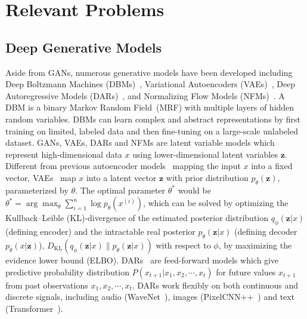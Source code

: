 \section{Relevant Problems}
\label{sec:related}

\subsection{Deep Generative Models}
\label{sec:dgm}

Aside from GANs, numerous generative models have been developed including Deep Boltzmann Machines (DBMs)~\cite{salakhutdinov2009deep,salakhutdinov2010efficient,montavon2012deep,srivastava2012multimodal}, Variational Autoencoders (VAEs)~\cite{kingma2013auto,higgins2017betavae}, Deep Autoregressive Models (DARs)~\cite{mathieu2015masked,vaswani2017attention,oord2016pixel,oord2016wavenet,salimans2017pixelcnn++}, and Normalizing Flow Models (NFMs)~\cite{dinh2016density,dinh2014nice,kingma2018glow,lugmayr2020srflow}.
A DBM is a binary Markov Random Field~(MRF) with multiple layers of hidden random variables. 
DBMs can learn complex and abstract representations by first training on limited, labeled data and then fine-tuning on a large-scale unlabeled dataset. 
GANs, VAEs, DARs and NFMs are latent variable models which represent high-dimensional data $x$ using lower-dimensional latent variables $\mathbf{z}$. 
Different from previous autoencoder models~\cite{rifai2011contractive,vincent2008extracting} mapping the input $x$ into a fixed vector, VAEs~\cite{kingma2013auto} map $x$ into a latent vector $\mathbf{z}$ with prior distribution $p_\theta(\mathbf{z})$, parameterized by $\theta$. 
The optimal parameter $\theta^{*}$ would be $\theta^{*} = \arg\max_\theta \sum_{i=1}^n \log p_\theta(x^{(i)})$, which can be solved by optimizing the Kullback–Leible (KL)-divergence of the estimated posterior distribution $q_\phi (\mathbf{z}\vert x)$ (defining encoder) and the intractable real posterior $p_\theta(\mathbf{z}\vert x)$ (defining decoder $p_\theta(x\vert \mathbf{z})$), $D_\text{KL}( q_\phi(\mathbf{z}\vert x) \| p_\theta(\mathbf{z}\vert x) )$ with respect to $\phi$, by maximizing the evidence lower bound (ELBO).
DARs~\cite{mathieu2015masked,vaswani2017attention} are feed-forward models which give predictive probability distribution $P(x_{t+1} | x_1, x_2, \cdots, x_t)$ for future values $x_{t+1}$ from past observations $x_1, x_2, \cdots, x_t$. DARs work flexibly on both continuous and discrete signals, including audio (WaveNet~\cite{oord2016wavenet}), images (PixelCNN++~\cite{salimans2017pixelcnn++}) and text (Transformer~\cite{vaswani2017attention}).
